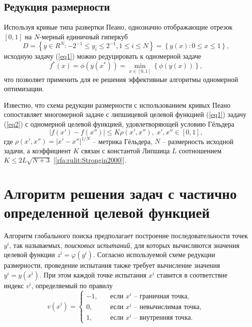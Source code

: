\documentclass[a4paper,12pt,russian]{article}
\begin{document}
\subsection{Редукция размерности}

Используя кривые типа развертки Пеано, однозначно отображающие отрезок $[0,1]$ на $N$-мерный единичный гиперкуб
\begin{equation}\label{eq2_} 
D=\left\{ y \in R^N: -2^{-1} \leq y_i \leq 2^{-1}, 1 \leq i \leq N \right\} = \left\{ y(x): 0 \leq x \leq 1 \right\},
\end{equation}
исходную задачу (\ref{eq1}) можно редуцировать к одномерной задаче
\begin{equation}\label{eq2} 
f^*(x)=\phi(y(x^* ))=\min_{x \in [0,1]} \left\{ \phi(y(x)) \right\},
\end{equation}
что позволяет применить для ее решения эффективные алгоритмы одномерной оптимизации. %


Известно, что схема редукции размерности с использованием кривых Пеано сопоставляет многомерной задаче с липшицевой целевой функцией (\ref{eq1}) задачу (\ref{eq2}) с одномерной целевой функцией, удовлетворяющей условию Гёльдера
\begin{equation}\label{eq4} 
| f(x')-f(x'') | \leq K \rho(x',x''), \; x',x'' \in [0,1],
\end{equation}
где $\rho(x',x'') =  |x' - x''|^{1/N}$ -- метрика Гёльдера, $N$ -- размерность исходной задачи, а коэффициент $K$ связан с константой Липшица $L$ соотношением $K \leq 2L\sqrt {N+3}$ [\ref{rfa:rulit:Strongin2000}].

\section{Алгоритм решения задач с частично определенной целевой функцией}\label{alg_discr}

Алгоритм глобального поиска предполагает построение последовательности точек $y^i$, так называемых, \textit{поисковых испытаний}, для которых вычисляются значения целевой функции $z^i = \varphi(y^i)$. Согласно используемой схеме редукции размерности, проведение испытания также требует вычисление значения $y^i=y(x^i)$. При этом каждой точке испытания $x^i$ ставится в соответствие индекс $v^i$, определяемый по правилу
\begin{equation}\label{eq6} 
v(x^i) =
  \begin{cases}
    -1, & {\quad \text{если } x^i \text{ -- граничная точка}},\\
    0, & {\quad \text{если } x^i \text{ -- невычислимая точка}},\\
    1, & {\quad \text{если } x^i \text{ -- внутренняя точка}}.
  \end{cases}
\end{equation}
\end{document}
